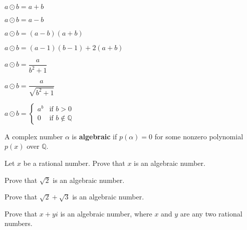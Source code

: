 \begin{multicols}{2}
\begin{chapex}
\label{cqClosureOfNumberSetsBegin}
$a \odot b = a + b$
\end{chapex}

\begin{chapex}
$a \odot b = a - b$
\end{chapex}

\begin{chapex}
$a \odot b = (a-b)(a+b)$
\end{chapex}

\begin{chapex}
$a \odot b = (a-1)(b-1) + 2(a+b)$
\end{chapex}

\begin{chapex}
$a \odot b = \dfrac{a}{b^2+1}$
\end{chapex}

\begin{chapex}
$a \odot b = \dfrac{a}{\sqrt{b^2+1}}$
\end{chapex}

\begin{chapex}
\label{cqClosureOfNumberSetsEnd}
$a \odot b = \begin{cases} a^{b} & \text{if $b > 0$} \\ 0 & \text{if $b \not\in \mathbb{Q}$} \end{cases}$
\end{chapex}
\end{multicols}

\begin{definition}
A complex number $\alpha$ is \textbf{algebraic} if $p(\alpha) = 0$ for some nonzero polynomial $p(x)$ over $\mathbb{Q}$.
\end{definition}

\begin{chapex}
Let $x$ be a rational number. Prove that $x$ is an algebraic number.
\end{chapex}

\begin{chapex}
Prove that $\sqrt{2}$ is an algebraic number.
\end{chapex}

\begin{chapex}
Prove that $\sqrt{2} + \sqrt{3}$ is an algebraic number.
\end{chapex}

\begin{chapex}
Prove that $x+yi$ is an algebraic number, where $x$ and $y$ are any two rational numbers.
\end{chapex}